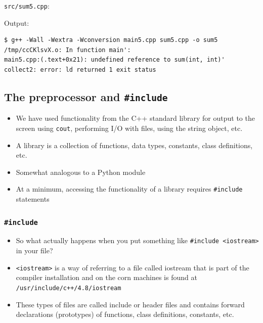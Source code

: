 \documentclass[12pt,letterpaper,twoside]{article}
\begin{document}
\texttt{src/sum5.cpp}:

\begin{cpp}
\begin{Highlighting}[]
\NormalTok{\}}
\end{Highlighting}
\end{cpp}

Output:

\begin{verbatim}
$ g++ -Wall -Wextra -Wconversion main5.cpp sum5.cpp -o sum5
/tmp/ccCKlsvX.o: In function main':
main5.cpp:(.text+0x21): undefined reference to sum(int, int)'
collect2: error: ld returned 1 exit status
\end{verbatim}

\subsection{\texorpdfstring{The preprocessor and \texttt{\#include}}{The preprocessor and \#include}}
\begin{itemize}
\item
  We have used functionality from the C++ standard library for output to
  the screen using \texttt{cout}, performing I/O with files, using the
  string object, etc.
\item
  A library is a collection of functions, data types, constants, class
  definitions, etc.
\item
  Somewhat analogous to a Python module
\item
  At a minimum, accessing the functionality of a library requires
  \texttt{\#include} statements
\end{itemize}

\subsubsection{\texorpdfstring{\texttt{\#include}}{\#include}}
\begin{itemize}
\item
  So what actually happens when you put something like
  \texttt{\#include\ \textless{}iostream\textgreater{}} in your file?
\item
  \texttt{\textless{}iostream\textgreater{}} is a way of referring to a
  file called iostream that is part of the compiler installation and on
  the corn machines is found at \texttt{/usr/include/c++/4.8/iostream}
\item
  These types of files are called include or header files and contains
  forward declarations (prototypes) of functions, class definitions,
  constants, etc.
\end{itemize}
\end{document}
